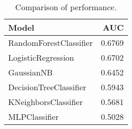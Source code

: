 \begin{table}
\centering
\caption{Comparison of performance.}
\label{tab:performance}
\begin{tabular}{lr}
\toprule
                 Model &    AUC \\
\midrule
RandomForestClassifier & 0.6769 \\
    LogisticRegression & 0.6702 \\
            GaussianNB & 0.6452 \\
DecisionTreeClassifier & 0.5943 \\
  KNeighborsClassifier & 0.5681 \\
         MLPClassifier & 0.5028 \\
\bottomrule
\end{tabular}
\end{table}
